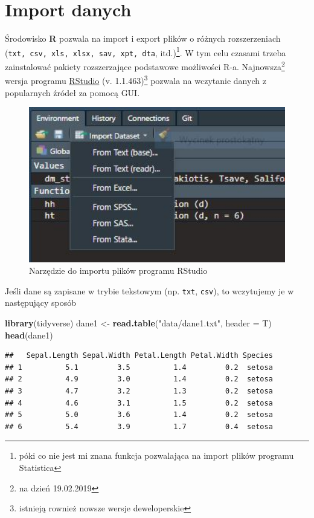 \documentclass[
]{book}
\newenvironment{Shaded}{\begin{snugshade}}{\end{snugshade}}
\newcommand{\AttributeTok}[1]{\textcolor[rgb]{0.13,0.29,0.53}{#1}}
\newcommand{\FunctionTok}[1]{\textcolor[rgb]{0.13,0.29,0.53}{\textbf{#1}}}
\newcommand{\NormalTok}[1]{#1}
\newcommand{\OtherTok}[1]{\textcolor[rgb]{0.56,0.35,0.01}{#1}}
\newcommand{\StringTok}[1]{\textcolor[rgb]{0.31,0.60,0.02}{#1}}
\theoremstyle{plain}
\theoremstyle{definition}
\theoremstyle{definition}
\theoremstyle{definition}
\theoremstyle{definition}
\theoremstyle{definition}
\theoremstyle{remark}
\begin{document}
\chapter{Import danych}\label{roz1}

Środowisko \textbf{R} pozwala na import i export plików o różnych rozszerzeniach (\texttt{txt,\ csv,\ xls,\ xlsx,\ sav,\ xpt,\ dta}, itd.)\footnote{póki co nie jest mi znana funkcja pozwalająca na import plików programu Statistica}. W tym celu czasami trzeba zainstalować pakiety rozszerzające podstawowe możliwości R-a. Najnowsza\footnote{na dzień 19.02.2019} wersja programu \href{https://www.rstudio.com}{RStudio} (v. 1.1.463)\footnote{istnieją rownież nowsze wersje deweloperskie} pozwala na wczytanie danych z popularnych źródeł za pomocą GUI.

\begin{figure}
\includegraphics[width=4.77in]{images/import} \caption{Narzędzie do importu plików programu RStudio}\label{fig:import1}
\end{figure}

Jeśli dane są zapisane w trybie tekstowym (np. \texttt{txt}, \texttt{csv}), to wczytujemy je w następujący sposób

\begin{Shaded}
\begin{Highlighting}[]
\FunctionTok{library}\NormalTok{(tidyverse)}
\NormalTok{dane1 }\OtherTok{\textless{}{-}} \FunctionTok{read.table}\NormalTok{(}\StringTok{"data/dane1.txt"}\NormalTok{, }\AttributeTok{header =}\NormalTok{ T)}
\FunctionTok{head}\NormalTok{(dane1)}
\end{Highlighting}
\end{Shaded}

\begin{verbatim}
##   Sepal.Length Sepal.Width Petal.Length Petal.Width Species
## 1          5.1         3.5          1.4         0.2  setosa
## 2          4.9         3.0          1.4         0.2  setosa
## 3          4.7         3.2          1.3         0.2  setosa
## 4          4.6         3.1          1.5         0.2  setosa
## 5          5.0         3.6          1.4         0.2  setosa
## 6          5.4         3.9          1.7         0.4  setosa
\end{verbatim}
\end{document}
